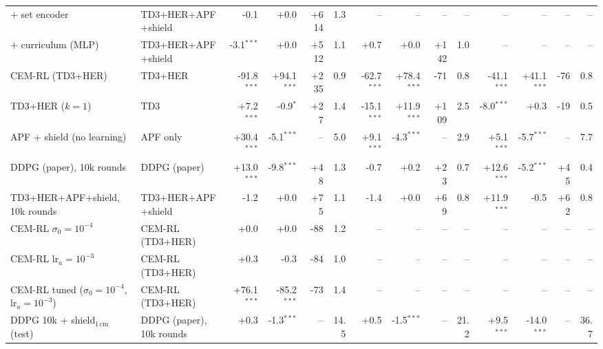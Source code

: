 \begin{table}[t]
{\begin{tabular}{llrrrrrrrrrrrr}
\quad + set encoder & TD3+HER+APF+shield & -0.1 & +0.0 & +614 & 1.3 & -- & -- & -- & -- & -- & -- & -- & -- \\
\quad + curriculum (MLP) & TD3+HER+APF+shield & -3.1$^{***}$ & +0.0 & +512 & 1.1 & +0.7 & +0.0 & +142 & 1.0 & -- & -- & -- & -- \\
CEM-RL (TD3+HER) & TD3+HER & -91.8$^{***}$ & +94.1$^{***}$ & +235 & 0.9 & -62.7$^{***}$ & +78.4$^{***}$ & -71 & 0.8 & -41.1$^{***}$ & +41.1$^{***}$ & -76 & 0.8 \\
TD3+HER ($k{=}1$) & TD3 & +7.2$^{***}$ & -0.9$^{*}$ & +27 & 1.4 & -15.1$^{***}$ & +11.9$^{***}$ & +109 & 2.5 & -8.0$^{***}$ & +0.3 & -19 & 0.5 \\
APF + shield (no learning) & APF only & +30.4$^{***}$ & -5.1$^{***}$ & -- & 5.0 & +9.1$^{***}$ & -4.3$^{***}$ & -- & 2.9 & +5.1$^{***}$ & -5.7$^{***}$ & -- & 7.7 \\
DDPG (paper), 10k rounds & DDPG (paper) & +13.0$^{***}$ & -9.8$^{***}$ & +48 & 1.3 & -0.7 & +0.2 & +23 & 0.7 & +12.6$^{***}$ & -5.2$^{***}$ & +45 & 0.4 \\
TD3+HER+APF+shield, 10k rounds & TD3+HER+APF+shield & -1.2 & +0.0 & +75 & 1.1 & -1.4 & +0.0 & +69 & 0.8 & +11.9$^{***}$ & -0.5 & +62 & 0.8 \\
CEM-RL $\sigma_0{=}10^{-4}$ & CEM-RL (TD3+HER) & +0.0 & +0.0 & -88 & 1.2 & -- & -- & -- & -- & -- & -- & -- & -- \\
CEM-RL lr$_a{=}10^{-3}$ & CEM-RL (TD3+HER) & +0.3 & -0.3 & -84 & 1.0 & -- & -- & -- & -- & -- & -- & -- & -- \\
CEM-RL tuned ($\sigma_0{=}10^{-4}$, lr$_a{=}10^{-3}$) & CEM-RL (TD3+HER) & +76.1$^{***}$ & -85.2$^{***}$ & -73 & 1.4 & -- & -- & -- & -- & -- & -- & -- & -- \\
DDPG 10k + shield$_{1\,\mathrm{cm}}$ (test) & DDPG (paper), 10k rounds & +0.3 & -1.3$^{***}$ & -- & 14.5 & +0.5 & -1.5$^{***}$ & -- & 21.2 & +9.5$^{***}$ & -14.0$^{***}$ & -- & 36.7 \\
\bottomrule
\end{tabular}
}
\end{table}